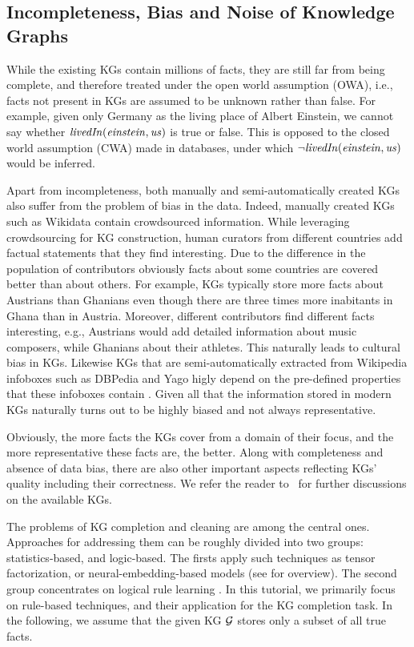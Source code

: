 \subsection{Incompleteness, Bias and Noise of Knowledge Graphs}
While the existing KGs contain millions of facts, they are still far from being complete, and therefore treated under the open world assumption (OWA), i.e., facts not present in KGs are assumed to be unknown rather than false. For example, given only Germany as the living place of Albert Einstein,  we cannot say whether $\mathit{livedIn(einstein,us)}$ is true or false. This is opposed to the closed world assumption (CWA) made in databases, under which $\mathit{\neg livedIn(einstein,us)}$ would be inferred. %

Apart from incompleteness, both manually and semi-automatically created KGs also suffer from the problem of bias in the data. Indeed,  manually created KGs such as Wikidata contain crowdsourced information. While leveraging crowdsourcing for KG construction, human curators from different countries add factual statements that they find interesting. Due to the difference in the population of contributors obviously facts about some countries are covered better than about others. For example, KGs typically store more facts about Austrians than Ghanians even though there are three times more inabitants in Ghana than in Austria. Moreover, different contributors find different facts interesting, e.g., Austrians would add detailed information about music composers, while Ghanians about their athletes.  This naturally leads to cultural bias in KGs. Likewise KGs that are semi-automatically extracted from Wikipedia infoboxes such as DBPedia and Yago higly depend on the pre-defined properties that these infoboxes contain \cite{DBLP:conf/www/LajusS18}. Given all that the information stored in modern KGs naturally turns out to be highly biased and not always representative. 

Obviously, the more facts the KGs cover from a %
domain  of their focus, and the more representative these facts are, %
the better. Along with completeness and absence of data bias, there are also other important aspects reflecting KGs' quality %
including %
their correctness.  We refer the reader to~\cite{Nickel2015ARO,DBLP:journals/semweb/Paulheim17} for further discussions on the available KGs.



The problems of KG completion and cleaning are %
among the central ones. Approaches for addressing them can be roughly divided into two groups: statistics-based, and logic-based. The firsts apply such techniques as tensor factorization, or neural-embedding-based models (see \cite{DBLP:journals/pieee/Nickel0TG16} for overview). The second group concentrates on logical rule learning \cite{ruleoverview}. In this tutorial, we primarily focus on rule-based techniques, and their application for the KG completion task. In the following, we assume that the given KG $\mathcal{G}$ stores only a subset of all true facts.

